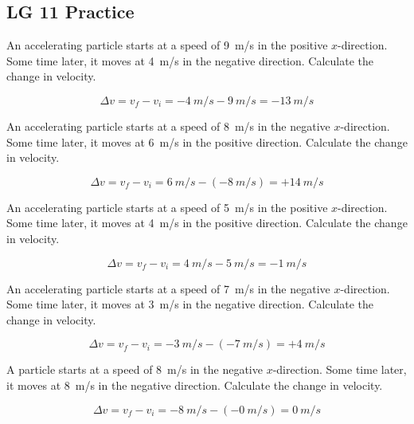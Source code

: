 \documentclass[answers]{exam}
\begin{document}
\clearpage

\subsection*{LG 11 Practice}

\begin{questions}
\question
An accelerating particle starts at a speed of \SI{9}{m/s} in the positive $x$-direction. Some time later, it moves at \SI{4}{m/s} in the negative direction. Calculate the change in velocity.

\begin{solution}
\begin{equation*}
    \Delta v = v_f - v_i = \SI{-4}{m/s} - \SI{9}{m/s} = \boxed{-\SI{13}{m/s}}
\end{equation*}
\end{solution}

\question
An accelerating particle starts at a speed of \SI{8}{m/s} in the negative $x$-direction. Some time later, it moves at \SI{6}{m/s} in the positive direction. Calculate the change in velocity.

\begin{solution}
\begin{equation*}
    \Delta v = v_f - v_i = \SI{6}{m/s} - (-\SI{8}{m/s}) = \boxed{+\SI{14}{m/s}}
\end{equation*}
\end{solution}

\question
An accelerating particle starts at a speed of \SI{5}{m/s} in the positive $x$-direction. Some time later, it moves at \SI{4}{m/s} in the positive direction. Calculate the change in velocity.

\begin{solution}
\begin{equation*}
    \Delta v = v_f - v_i = \SI{4}{m/s} - \SI{5}{m/s} = \boxed{-\SI{1}{m/s}}
\end{equation*}
\end{solution}

\question
An accelerating particle starts at a speed of \SI{7}{m/s} in the negative $x$-direction. Some time later, it moves at \SI{3}{m/s} in the negative direction. Calculate the change in velocity.

\begin{solution}
\begin{equation*}
    \Delta v = v_f - v_i = -\SI{3}{m/s} - (-\SI{7}{m/s}) = \boxed{+\SI{4}{m/s}}
\end{equation*}
\end{solution}

\question
A particle starts at a speed of \SI{8}{m/s} in the negative $x$-direction. Some time later, it moves at \SI{8}{m/s} in the negative direction. Calculate the change in velocity.

\begin{solution}
\begin{equation*}
    \Delta v = v_f - v_i = -\SI{8}{m/s} - (-\SI{0}{m/s}) = \boxed{\SI{0}{m/s}}
\end{equation*}
\end{solution}
\end{questions}
\end{document}
